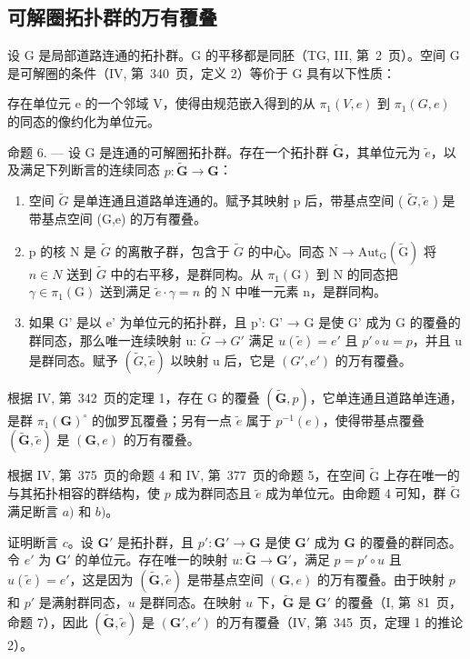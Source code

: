 \subsection{可解圈拓扑群的万有覆叠}

设 G 是局部道路连通的拓扑群。G 的平移都是同胚（TG, III, 第~2~页）。空间 G 是可解圈的条件（IV, 第~340~页，定义 2）等价于 G 具有以下性质：

存在单位元 e 的一个邻域 V，使得由规范嵌入得到的从 \(\pi_{1}(V,e)\) 到 \(\pi_{1}(G,e)\) 的同态的像约化为单位元。

命题 6. --- 设 G 是连通的可解圈拓扑群。存在一个拓扑群 \(\widetilde{\mathbf{G}}\)，其单位元为 \(\widetilde{e}\)，以及满足下列断言的连续同态 \(p\colon \widetilde{\mathbf{G}}\to \mathbf{G}\)：

\begin{enumerate}
\def\labelenumi{\alph{enumi})}
\item
  空间 \(\widetilde{G}\) 是单连通且道路单连通的。赋予其映射 p 后，带基点空间 ( \(\widetilde{G},\widetilde{e}\) ) 是带基点空间 (G,e) 的万有覆叠。
\item
  p 的核 N 是 \(\widetilde{G}\) 的离散子群，包含于 \(\widetilde{G}\) 的中心。同态 \(\mathrm{N}\to\mathrm{Aut}_{\mathrm{G}}(\widetilde{\mathrm{G}})\) 将 \(n\in N\) 送到 \(\widetilde{G}\) 中的右平移，是群同构。从 \(\pi_{1}(\mathrm{G})\) 到 N 的同态把 \(\gamma\in\pi_{1}(\mathrm{G})\) 送到满足 \(\widetilde{e}\cdot\gamma=n\) 的 N 中唯一元素 n，是群同构。
\item
  如果 G' 是以 e' 为单位元的拓扑群，且 p': G' → G 是使 G' 成为 G 的覆叠的群同态，那么唯一连续映射 u: \(\widetilde{G} \rightarrow G'\) 满足 \(u(\widetilde{e}) = e'\) 且 \(p' \circ u = p\)，并且 u 是群同态。赋予 \((\widetilde{G}, \widetilde{e})\) 以映射 u 后，它是 \((G', e')\) 的万有覆叠。
\end{enumerate}

根据 IV, 第~342~页的定理 1，存在 G 的覆叠 \((\widetilde{\mathbf{G}},p)\)，它单连通且道路单连通，是群 \(\pi_1(\mathbf{G})^\circ\) 的伽罗瓦覆叠；另有一点 \(\widetilde{e}\) 属于 \(p^{-1}(e)\)，使得带基点覆叠 \((\widetilde{\mathbf{G}},\widetilde{e})\) 是 \((\mathbf{G},e)\) 的万有覆叠。

根据 IV, 第~375~页的命题 4 和 IV, 第~377~页的命题 5，在空间 \(\widetilde{\mathrm{G}}\) 上存在唯一的与其拓扑相容的群结构，使 \(p\) 成为群同态且 \(\widetilde{e}\) 成为单位元。由命题 4 可知，群 \(\widetilde{\mathrm{G}}\) 满足断言 \(a)\) 和 \(b)\)。

证明断言 \(c\)。设 \(\mathbf{G}'\) 是拓扑群，且 \(p'\colon \mathbf{G}' \to \mathbf{G}\) 是使 \(\mathbf{G}'\) 成为 \(\mathbf{G}\) 的覆叠的群同态。令 \(e'\) 为 \(\mathbf{G}'\) 的单位元。存在唯一的映射 \(u\colon \widetilde{\mathbf{G}} \to \mathbf{G}'\)，满足 \(p = p' \circ u\) 且 \(u(\widetilde{e}) = e'\)，这是因为 \((\widetilde{\mathbf{G}}, \widetilde{e})\) 是带基点空间 \((\mathbf{G}, e)\) 的万有覆叠。由于映射 \(p\) 和 \(p'\) 是满射群同态，\(u\) 是群同态。在映射 \(u\) 下，\(\widetilde{\mathbf{G}}\) 是 \(\mathbf{G}'\) 的覆叠（I, 第~81~页，命题 7），因此 \((\widetilde{\mathbf{G}}, \widetilde{e})\) 是 \((\mathbf{G}', e')\) 的万有覆叠（IV, 第~345~页，定理 1 的推论 2）。

